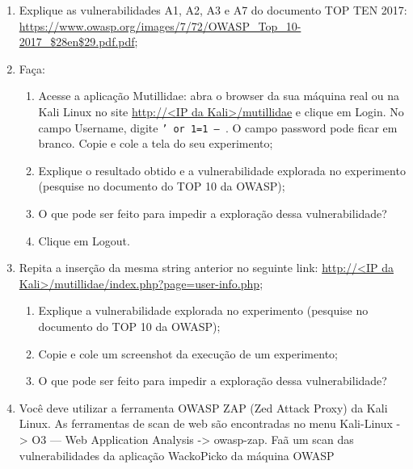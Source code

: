 \documentclass{article}
\begin{document}
    \begin{superframe}
        \begin{enumerate}
            \item Explique as vulnerabilidades A1, A2, A3 e A7 do documento TOP TEN
                2017:
                \url{https://www.owasp.org/images/7/72/OWASP_Top_10-2017_$28en$29.pdf.pdf};
            \item Faça:
                \begin{enumerate}
                    \item Acesse a aplicação Mutillidae: abra o browser da sua
                        máquina real ou na Kali Linux no site \url{http://<IP da
                        Kali>/mutillidae} e clique em Login. No campo Username,
                        digite \texttt{' or 1=1 -- }. O campo password pode ficar
                        em branco. Copie e cole a tela do seu experimento;
                    \item Explique o resultado obtido e a vulnerabilidade explorada
                        no experimento (pesquise no documento do TOP 10 da OWASP);
                    \item O que pode ser feito para impedir a exploração dessa
                        vulnerabilidade?
                    \item Clique em Logout.
                \end{enumerate}
            \item Repita a inserção da mesma string anterior no seguinte link:
                \url{http://<IP da Kali>/mutillidae/index.php?page=user-info.php};
                \begin{enumerate}
                    \item Explique a vulnerabilidade explorada no experimento
                        (pesquise no documento do TOP 10 da OWASP);
                    \item Copie e cole um screenshot da execução de um experimento;
                    \item O que pode ser feito para impedir a exploração dessa
                        vulnerabilidade?
                \end{enumerate}
            \item Você deve utilizar a ferramenta OWASP ZAP (Zed Attack Proxy) da
                Kali Linux. As ferramentas de scan de web são encontradas no menu
                Kali-Linux -> O3 --- Web Application Analysis -> owasp-zap. Faã um
                scan das vulnerabilidades da aplicação WackoPicko da máquina OWASP

\end{enumerate}
\end{superframe}
\end{document}
